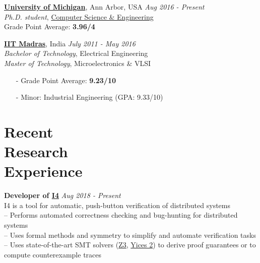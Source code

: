 \documentclass[margin,line,letter]{resume}
\begin{document}
\begin{resume}
    \href{http://www.umich.edu}{\textbf{University of Michigan}}, Ann Arbor, USA \hfill \emph{Aug 2016 - Present} \\ 
    \phantom{x}\hspace{3ex} \emph{Ph.D. student}, \href{http://www.cse.umich.edu}{Computer Science \& Engineering} \\
    \phantom{x}\hspace{3ex} Grade Point Average: \textbf{3.96/4}

    \vspace{-0.2cm}
    \href{http://www.iitm.ac.in}{\textbf{IIT Madras}}, India \hfill \emph{July 2011 - May 2016} \\ 
    \phantom{xx}\hspace{3ex} \emph{Bachelor of Technology}, Electrical Engineering \\
    \phantom{xx}\hspace{3ex} \emph{Master of Technology}, Microelectronics \& VLSI 
    
    \vspace{-0.2cm}
    \begin{itemize}[leftmargin=1.25cm]
        \item[-] Grade Point Average: \textbf{9.23/10}
        \item[-] Minor: Industrial Engineering (GPA: 9.33/10)
    \end{itemize}

    
\section{\mysidestyle Recent\\Research\\Experience}
    \textbf{Developer of \href{https://github.com/GLaDOS-Michigan/I4}{\textbf{I4}}} \hfill \emph{Aug 2018 - Present}\\
    \phantom{xx}\hspace{1ex} I4 is a tool for automatic, push-button verification of distributed systems \\
    \phantom{xx}\hspace{1ex} -- Performs automated correctness checking and bug-hunting for distributed systems \\
    \phantom{xx}\hspace{1ex} -- Uses formal methods and symmetry to simplify and automate verification tasks \\
    \phantom{xx}\hspace{1ex} -- Uses state-of-the-art SMT solvers (\href{https://github.com/Z3Prover/z3}{Z3}, \href{https://github.com/SRI-CSL/yices2}{Yices 2}) to derive proof guarantees or to \\ \phantom{xx}\hspace{3ex} compute counterexample traces


\end{resume}
\end{document}
